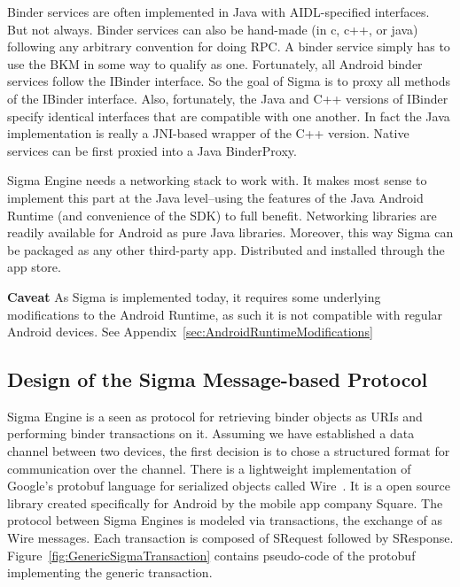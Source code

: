 \documentclass[prodmode]{acmlarge}
\begin{document}
Binder services are often implemented in Java with AIDL-specified interfaces. But not always. Binder services can also be hand-made (in c, c++, or java) following any arbitrary convention for doing RPC. A binder service simply has to use the BKM in some way to qualify as one. Fortunately, all Android binder services follow the IBinder interface. So the goal of Sigma is to proxy all methods of the IBinder interface. Also, fortunately, the Java and C++ versions of IBinder specify identical interfaces that are compatible with one another. In fact the Java implementation is really a JNI-based wrapper of the C++ version. Native services can be first proxied into a Java BinderProxy.

Sigma Engine needs a networking stack to work with. It makes most sense to implement this part at the Java level--using the features of the Java Android Runtime (and convenience of the SDK) to full benefit. Networking libraries are readily available for Android as pure Java libraries. Moreover, this way Sigma can be packaged as any other third-party app. Distributed and installed through the app store.

\textbf{Caveat} As Sigma is implemented today, it requires some underlying modifications to the Android Runtime, as such it is not compatible with regular Android devices. See Appendix~\ref{sec:AndroidRuntimeModifications}

\subsection{Design of the Sigma Message-based Protocol}
Sigma Engine is a seen as protocol for retrieving binder objects as URIs and performing binder transactions on it. Assuming we have established a data channel between two devices, the first decision is to chose a structured format for communication over the channel. There is a lightweight implementation of Google's protobuf language for serialized objects called Wire~\cite{Wire,IntroWire}. It is a open source library created specifically for Android by the mobile app company Square. The protocol between Sigma Engines is modeled via transactions, the exchange of as Wire messages. Each transaction is composed of SRequest followed by SResponse. Figure~\ref{fig:GenericSigmaTransaction} contains pseudo-code of the protobuf implementing the generic transaction.
\end{document}

